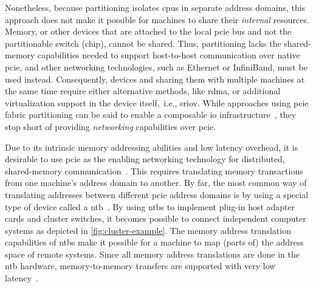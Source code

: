 Nonetheless, because partitioning isolates \glspl{cpu} in separate address domains, this approach does not make it possible for machines to share their \emph{internal} resources.
%
Memory, or other devices that are attached to the local \gls{pcie} bus and not the partitionable switch (chip), cannot be shared.
%
Thus, partitioning lacks the shared-memory capabilities needed to support host-to-host communication over native \gls{pcie}, and other networking technologies, such as Ethernet or InfiniBand, must be used instead.
%
Consequently,  devices and sharing them with multiple machines at the same time require either alternative methods, like \gls{rdma}, or additional virtualization support in the device itself,~i.e., \gls{sriov}.
%
While approaches using \gls{pcie} fabric partitioning can be said to enable a composable \gls{io} infrastructure~\cite{Chung2018}, they stop short of providing \emph{networking} capabilities over \gls{pcie}.



Due to its intrinsic memory addressing abilities and low latency overhead, it is desirable to use \gls{pcie} as the enabling networking technology for distributed, shared-memory communication~\cite{Shim2018,whitepaper:Regula2004,url:Meduri2011}.
%
This requires translating memory transactions from one machine's address domain to another.
%
By far, the most common way of translating addresses between different \gls{pcie} address domains is by using a special type of device called a \gls{ntb}~\cite{whitepaper:PLX,whitepaper:Regula2004,Hou2013,Tu2014}.
%
%
By using \glspl{ntb} to implement plug-in host adapter cards and cluster switches, it becomes possible to connect independent computer systems as depicted in \cref{fig:cluster-example}.
%
The memory address translation capabilities of \glspl{ntb} make it possible for a machine to map (parts of) the address space of remote systems.
%
Since all memory address translations are done in the \gls{ntb} hardware, memory-to-memory transfers are supported with very low latency~\cite{Lim2019,Tu2014}.




